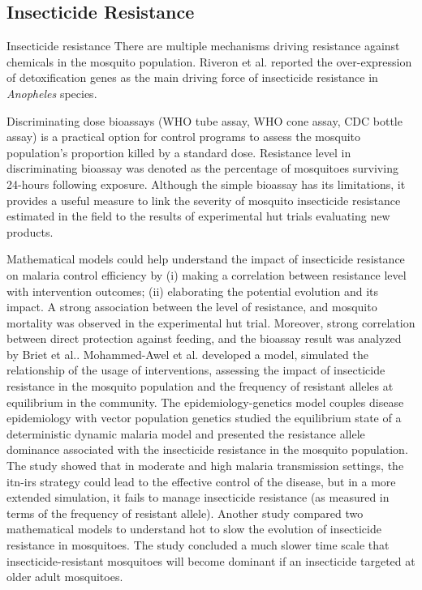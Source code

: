 \documentclass[a4paper, 12pt, twoside]{report}
\begin{document}
\subsection{Insecticide Resistance}
Insecticide resistance 
There are multiple mechanisms driving resistance against chemicals in the mosquito population.
Riveron\cite{Riveron2014b} et al. reported the over-expression of detoxification genes as the main driving force of insecticide resistance in \textit{Anopheles} species.

Discriminating dose bioassays (WHO tube assay, WHO cone assay, CDC bottle assay) is a practical option for control programs to assess the mosquito population's proportion killed by a standard dose.
Resistance level in discriminating bioassay was denoted as the percentage of mosquitoes surviving 24-hours following exposure.
Although the simple bioassay has its limitations, it provides a useful measure to link the severity of mosquito insecticide resistance estimated in the field to the results of experimental hut trials evaluating new products.

Mathematical models could help understand the impact of insecticide resistance on malaria control efficiency by (i) making a correlation between resistance level with intervention outcomes; (ii) elaborating the potential evolution and its impact.
A strong association between the level of resistance, and mosquito mortality was observed in the experimental hut trial\cite{Sherrard-Smith2018b}.
Moreover, strong correlation between direct protection against feeding, and the bioassay result was analyzed by Briet et al.\cite{Briet2013}.
Mohammed-Awel et al.\cite{Mohammed-Awel2019} developed a model, simulated the relationship of the usage of interventions, assessing the impact of insecticide resistance in the mosquito population and the frequency of resistant alleles at equilibrium in the community. 
The epidemiology-genetics model couples disease epidemiology with vector population genetics studied the equilibrium state of a deterministic dynamic malaria model and presented the resistance allele dominance associated with the insecticide resistance in the mosquito population.
The study showed that in moderate and high malaria transmission settings, the \gls{itn}-\gls{irs} strategy could lead to the effective control of the disease, but in a more extended simulation, it fails to manage insecticide resistance (as measured in terms of the frequency of resistant allele).
Another study\cite{Gourley2011} compared two mathematical models to understand hot to slow the evolution of insecticide resistance in mosquitoes.
The study concluded a much slower time scale that insecticide-resistant mosquitoes will become dominant if an insecticide targeted at older adult mosquitoes.
\end{document}
